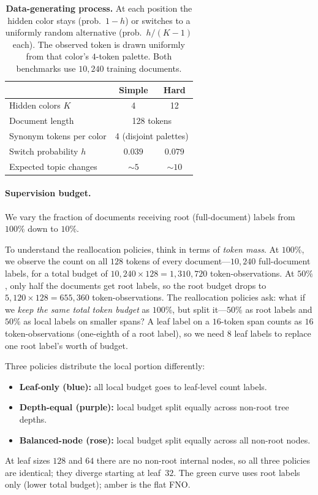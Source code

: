 \begin{table}[t]
    \centering
    \small
    \begin{tabular}{lcc}
        \toprule
        & \textbf{Simple} & \textbf{Hard} \\
        \midrule
        Hidden colors $K$ & 4 & 12 \\
        Document length & \multicolumn{2}{c}{128 tokens} \\
        Synonym tokens per color & \multicolumn{2}{c}{4 (disjoint palettes)} \\
        \midrule
        Switch probability $h$ & $0.039$ & $0.079$ \\
        Expected topic changes & ${\sim}5$ & ${\sim}10$ \\
        \bottomrule
    \end{tabular}
    \caption{\textbf{Data-generating process.}
    At each position the hidden color stays (prob.\ $1{-}h$) or switches to a uniformly random alternative (prob.\ $h/(K{-}1)$ each). The observed token is drawn uniformly from that color's $4$-token palette. Both benchmarks use $10{,}240$ training documents.}
    \label{tab:dgp}
\end{table}

\paragraph{Supervision budget.}
We vary the fraction of documents receiving root (full-document) labels from $100\%$ down to $10\%$.

To understand the reallocation policies, think in terms of \emph{token mass}. At $100\%$, we observe the count on all $128$ tokens of every document---$10{,}240$ full-document labels, for a total budget of $10{,}240 \times 128 = 1{,}310{,}720$ token-observations. At $50\%$, only half the documents get root labels, so the root budget drops to $5{,}120 \times 128 = 655{,}360$ token-observations. The reallocation policies ask: what if we \emph{keep the same total token budget} as $100\%$, but split it---$50\%$ as root labels and $50\%$ as local labels on smaller spans? A leaf label on a $16$-token span counts as $16$ token-observations (one-eighth of a root label), so we need $8$ leaf labels to replace one root label's worth of budget.

Three policies distribute the local portion differently:
\begin{itemize}[leftmargin=1.5em]
    \item \textbf{Leaf-only (blue):} all local budget goes to leaf-level count labels.
    \item \textbf{Depth-equal (purple):} local budget split equally across non-root tree depths.
    \item \textbf{Balanced-node (rose):} local budget split equally across all non-root nodes.
\end{itemize}
At leaf sizes $128$ and $64$ there are no non-root internal nodes, so all three policies are identical; they diverge starting at leaf~$32$. The green curve uses root labels only (lower total budget); amber is the flat FNO.

